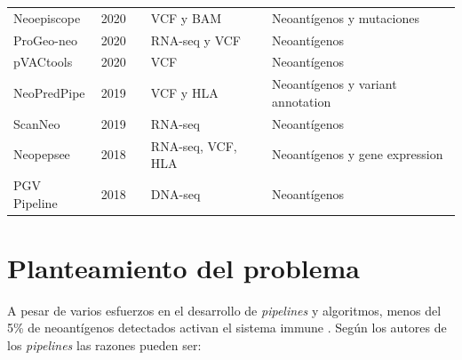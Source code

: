 \documentclass[a4paper]{article}
\begin{document}
\begin{table}[h]
{\begin{tabular}{lp{0.6cm}p{3cm}p{4.5cm}p{2.7cm}}
	Neoepiscope     & 2020 &\cite{wood2020neoepiscope}        & VCF y BAM                   & Neoantígenos y mutaciones                          \\
	
	ProGeo-neo      & 2020 &\cite{li2020progeo}               & RNA-seq y VCF                        & Neoantígenos                                       \\
	
	pVACtools       & 2020 &\cite{hundal2020pvactools}        & VCF                                         & Neoantígenos                                       \\
	
	NeoPredPipe     & 2019 &\cite{schenck2019neopredpipe}     & VCF y HLA                            & Neoantígenos y variant annotation              \\
	
	ScanNeo         & 2019 &\cite{wang2019scanneo}            & RNA-seq                                                  & Neoantígenos                                       \\
	
		
	Neopepsee       & 2018 &\cite{kim2018neopepsee}           & RNA-seq, VCF, HLA  & Neoantígenos y gene expression    \\ 
	
	PGV Pipeline    & 2018 &\cite{rubinsteyn2018computational}& DNA-seq                                                  & Neoantígenos                                       \\
	
	
	
	
	
\end{tabular}
	
	}
\end{table}




\section{Planteamiento del problema}

A pesar de varios esfuerzos en el desarrollo de \textit{pipelines} y algoritmos, menos del 5\% de neoantígenos detectados activan el sistema immune \citep{de2020neoantigen, mill2022neoms, bulik2019deep, bassani2015mass, yadav2014predicting}. Según los autores de los \textit{pipelines} las razones pueden ser: 
\end{document}

